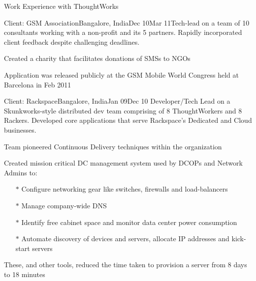 \documentclass{resume} %
\begin{document}
\begin{rSection}{Work Experience with ThoughtWorks}
\begin{rSubsection}{Client: GSM Association}{Bangalore, India}{Dec 10}{Mar 11}{Tech-lead on a team of 10 consultants working with a non-profit
  and its 5 partners. Rapidly incorporated client feedback despite
  challenging deadlines.}
\item Created a charity that facilitates donations of SMSs to NGOs
\item Application was released publicly at the GSM Mobile World Congress held at Barcelona in Feb 2011
\end{rSubsection}



\begin{rSubsection}{Client: Rackspace}{Bangalore, India}{Jan 09}{Dec
    10}
{Developer/Tech Lead on a Skunkworks-style distributed dev team comprising of 8
  ThoughtWorkers and 8 Rackers. Developed core applications that
serve Rackspace's Dedicated and Cloud businesses.}

\item Team pioneered Continuous Delivery techniques within the organization
\item Created mission critical DC management system used by
  DCOPs and Network Admins to:
\vspace{-0.5em}
\begin{itemize}  \itemsep0.5pt \parskip0pt
    \item[$\ast$] Configure networking gear like switches, firewalls and load-balancers
    \item[$\ast$] Manage company-wide DNS
    \item[$\ast$] Identify free cabinet space and monitor data center power consumption
    \item[$\ast$] Automate discovery of devices and servers, allocate IP addresses and kick-start servers
\end{itemize}
\item These, and other tools, reduced the time taken to provision a server from 8 days to 18 minutes
\end{rSubsection}

\end{rSection}

\end{document}

